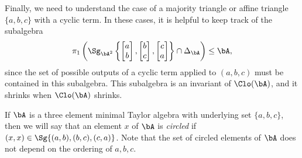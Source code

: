 Finally, we need to understand the case of a majority triangle or affine triangle $\{a,b,c\}$ with a cyclic term. In these cases, it is helpful to keep track of the subalgebra
\[
\pi_1\left(\Sg_{\bA^2}\left\{\begin{bmatrix} a\\ b\end{bmatrix}, \begin{bmatrix} b\\ c\end{bmatrix}, \begin{bmatrix} c\\ a\end{bmatrix}\right\} \cap \Delta_\bA\right) \le \bA,
\]
since the set of possible outputs of a cyclic term applied to $(a,b,c)$ must be contained in this subalgebra. This subalgebra is an invariant of $\Clo(\bA)$, and it shrinks when $\Clo(\bA)$ shrinks.

\begin{defn} If $\bA$ is a three element minimal Taylor algebra with underlying set $\{a,b,c\}$, then we will say that an element $x$ of $\bA$ is \emph{circled} if $(x,x) \in \Sg\{(a,b),(b,c),(c,a)\}$. Note that the set of circled elements of $\bA$ does not depend on the ordering of $a,b,c$.
\end{defn}

